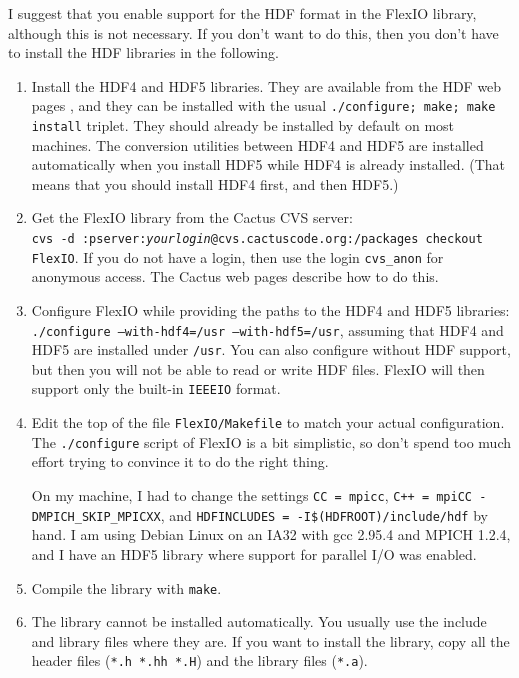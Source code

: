 I suggest that you enable support for the HDF format in the FlexIO
library, although this is not necessary.  If you don't want to do
this, then you don't have to install the HDF libraries in the
following.

\begin{enumerate}

\item
Install the HDF4 and HDF5 libraries.  They are available from the HDF
web pages \cite{Carpet__HDF}, and they can be installed with the usual
\texttt{./configure; make; make install} triplet.  They should already
be installed by default on most machines.  The conversion utilities
between HDF4 and HDF5 are installed automatically when you install
HDF5 while HDF4 is already installed.  (That means that you should
install HDF4 first, and then HDF5.)

\item
Get the FlexIO library from the Cactus CVS server:\\ \texttt{cvs -d
:pserver:\textit{yourlogin}@cvs.cactuscode.org:/packages checkout
FlexIO}.  If you do not have a login, then use the login
\texttt{cvs\_anon} for anonymous access.  The Cactus web pages
describe how to do this.

\item
Configure FlexIO while providing the paths to the HDF4 and HDF5
libraries: \texttt{./configure --with-hdf4=/usr --with-hdf5=/usr},
assuming that HDF4 and HDF5 are installed under \texttt{/usr}.  You
can also configure without HDF support, but then you will not be able
to read or write HDF files.  FlexIO will then support only the
built-in \texttt{IEEEIO} format.

\item
Edit the top of the file \texttt{FlexIO/Makefile} to match your actual
configuration.  The \texttt{./configure} script of FlexIO is a bit
simplistic, so don't spend too much effort trying to convince it to do
the right thing.

On my machine, I had to change the settings \texttt{CC = mpicc},
\texttt{C++ = mpiCC -DMPICH\_SKIP\_MPICXX}, and \texttt{HDFINCLUDES =
-I\$(HDFROOT)/include/hdf} by hand.  I am using Debian Linux on an
IA32 with gcc 2.95.4 and MPICH 1.2.4, and I have an HDF5 library where
support for parallel I/O was enabled.

\item
Compile the library with \texttt{make}.

\item
The library cannot be installed automatically.  You usually use the
include and library files where they are.  If you want to install the
library, copy all the header files (\texttt{*.h *.hh *.H}) and the
library files (\texttt{*.a}).

\end{enumerate}

